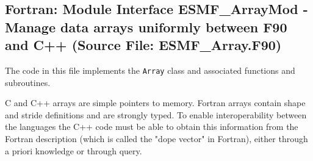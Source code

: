  
\setlength{\parskip}{0pt}
\setlength{\parindent}{0pt}
\setlength{\baselineskip}{11pt}
 
\def\bv{\begin{verbatim}}
\def\ev{\end{verbatim}}
\def\be{\begin{equation}}
\def\ee{\end{equation}}
\def\bea{\begin{eqnarray}}
\def\eea{\end{eqnarray}}
\def\bi{\begin{itemize}}
\def\ei{\end{itemize}}
\def\bn{\begin{enumerate}}
\def\en{\end{enumerate}}
\def\bd{\begin{description}}
\def\ed{\end{description}}
\def\({\left (}
\def\){\right )}
\def\[{\left [}
\def\]{\right ]}
\def\<{\left  \langle}
\def\>{\right \rangle}
\def\cI{{\cal I}}
\def\diag{\mathop{\rm diag}}
\def\tr{\mathop{\rm tr}}


 
\subsection{Fortran:  Module Interface ESMF\_ArrayMod - Manage data arrays uniformly between F90 and C++ (Source File: ESMF\_Array.F90)}


  
  
   The code in this file implements the {\tt Array} class and
   associated functions and subroutines.
  
   C and C++ arrays are simple pointers to memory.
   Fortran arrays contain shape and stride definitions and are strongly
   typed. To enable interoperability between the languages the C++ code
   must be able to obtain this information from the Fortran description
   (which is called the "dope vector" in Fortran), either through a priori
   knowledge or through query.
  
